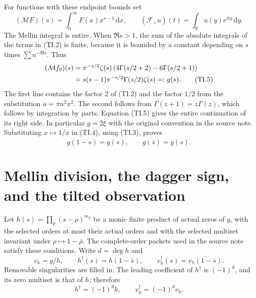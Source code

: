 \documentclass[11pt]{article}
\newcommand{\M}{\mathcal M}
\newcommand{\F}{\mathcal F}
\newcommand{\ii}{\mathrm i}
\newcommand{\dd}{\,\mathrm d}
\begin{document}
For functions with these endpoint bounds set
\begin{equation}
 (\M F)(s)=\int_0^\infty F(x)x^{s-1}\dd x,
 \qquad (\F_+u)(t)=\int_{\mathbb R}u(y)e^{\ii ty}\dd y.
 \tag{TI.4}
\end{equation}
The Mellin integral is entire. When $\Re s>1$, the sum of the absolute
integrals of the terms in (TI.2) is finite, because it is bounded by a
constant depending on $s$ times $\sum n^{-\Re s}$. Thus
\begin{align}
 (\M f_0)(s)
 &=\pi^{-s/2}\zeta(s)
 \left(4\Gamma(s/2+2)-6\Gamma(s/2+1)\right)\notag\\
 &=s(s-1)\pi^{-s/2}\Gamma(s/2)\zeta(s)=:g(s). \tag{TI.5}
\end{align}
The first line contains the factor $2$ of (TI.2) and the factor $1/2$
from the substitution $u=\pi n^2x^2$. The second follows from
$\Gamma(z+1)=z\Gamma(z)$, which follows by integration by parts.
Equation (TI.5) gives the entire continuation of its right side. In
particular $g=2\xi$ with the original convention in the source note.
Substituting $x\mapsto1/x$ in (TI.4), using (TI.3), proves
\begin{equation}
 g(1-s)=g(s),\qquad \overline{g(\bar s)}=g(s).
 \tag{TI.6}
\end{equation}

\section{Mellin division, the dagger sign, and the tilted observation}

Let $h(s)=\prod_\rho(s-\rho)^{m_\rho}$ be a monic finite product of
actual zeros of $g$, with the selected orders at most their actual
orders and with the selected multiset invariant under
$\rho\mapsto1-\bar\rho$. The complete-order packets used in the source
note satisfy these conditions. Write $d=\deg h$ and
\begin{equation}
 v_h=g/h,\qquad h^\dagger(s)=\overline{h(1-\bar s)},\qquad
 v_h^\dagger(s)=\overline{v_h(1-\bar s)}.
 \tag{TI.7}
\end{equation}
Removable singularities are filled in. The leading coefficient of
$h^\dagger$ is $(-1)^d$, and its zero multiset is that of $h$; therefore
\begin{equation}
 h^\dagger=(-1)^d h,\qquad v_h^\dagger=(-1)^d v_h.
 \tag{TI.8}
\end{equation}
\end{document}
